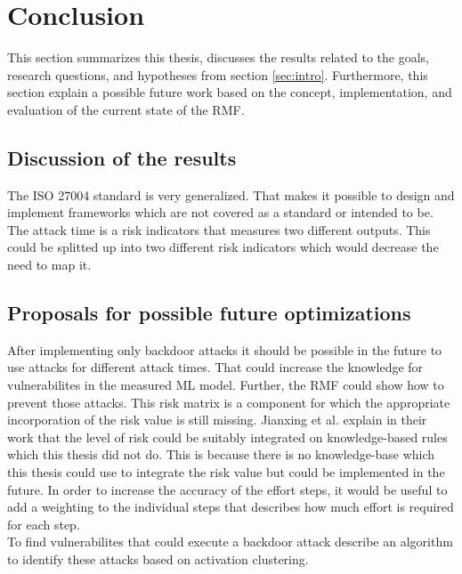 \section{Conclusion}
\label{sec:conclusion}

This section summarizes this thesis, discusses the results related to the goals, research questions, and hypotheses from section \ref{sec:intro}. Furthermore, this section explain a possible future work based on the concept, implementation, and evaluation of the current state of the RMF.

\subsection{Discussion of the results}

The ISO 27004 standard is very generalized. That makes it possible to design and implement frameworks which are not covered as a standard or intended to be. The attack time is a risk indicators that measures two different outputs. This could be splitted up into two different risk indicators which would decrease the need to map it.

\subsection{Proposals for possible future optimizations}

After implementing only backdoor attacks it should be possible in the future to use attacks for different attack times. That could increase the knowledge for vulnerabilites in the measured ML model. Further, the RMF could show how to prevent those attacks. This risk matrix is a component for which the appropriate incorporation of the risk value is still missing. Jianxing et al. \cite{DBLP:journals/access/JianxingHSH21} explain in their work that the level of risk could be suitably integrated on knowledge-based rules which this thesis did not do. This is because there is no knowledge-base which this thesis could use to integrate the risk value but could be implemented in the future. In order to increase the accuracy of the effort steps, it would be useful to add a weighting to the individual steps that describes how much effort is required for each step. \\
To find vulnerabilites that could execute a backdoor attack \cite{DBLP:journals/corr/abs-1811-03728} describe an algorithm to identify these attacks based on activation clustering.
